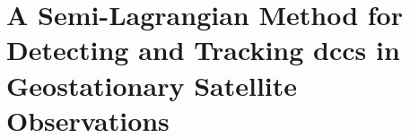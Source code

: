 \chapter{A Semi-Lagrangian Method for Detecting and Tracking \acrshort{dcc}s in Geostationary Satellite Observations}




